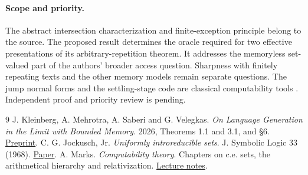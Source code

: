 \documentclass[11pt]{article}
\begin{document}
\paragraph{Scope and priority.} The abstract intersection characterization and finite-exception principle belong to the source. The proposed result determines the oracle required for two effective presentations of its arbitrary-repetition theorem. It addresses the memoryless set-valued part of the authors' broader access question. Sharpness with finitely repeating texts and the other memory models remain separate questions. The jump normal forms and the settling-stage code are classical computability tools \cite{marks}. Independent proof and priority review is pending.
\begin{thebibliography}{9}
 J. Kleinberg, A. Mehrotra, A. Saberi and G. Velegkas. \emph{On Language Generation in the Limit with Bounded Memory}. 2026, Theorems 1.1 and 3.1, and \S6. \href{https://arxiv.org/abs/2605.30324}{Preprint}.
 C. G. Jockusch, Jr. \emph{Uniformly introreducible sets}. J. Symbolic Logic 33 (1968). \href{https://www.cambridge.org/core/journals/journal-of-symbolic-logic/article/abs/uniformly-introreducible-sets1/C4F7EB1AFE2007904BB7335A01BECEFC}{Paper}.
 A. Marks. \emph{Computability theory}. Chapters on c.e. sets, the arithmetical hierarchy and relativization. \href{https://math.berkeley.edu/~marks/notes/computability_notes_v1.pdf}{Lecture notes}.
\end{thebibliography}
\end{document}
